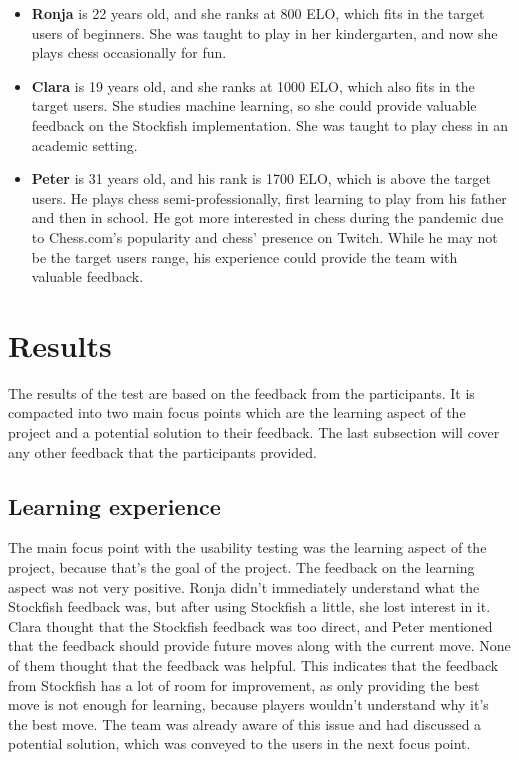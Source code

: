 \begin{itemize}

    \item \textbf{Ronja} is 22 years old, and she ranks at 800 ELO, which fits in the target users of beginners.
    She was taught to play in her kindergarten, and now she plays chess occasionally for fun.

    \item \textbf{Clara} is 19 years old, and she ranks at 1000 ELO, which also fits in the target users.
    She studies machine learning, so she could provide valuable feedback on the Stockfish implementation.
    She was taught to play chess in an academic setting.

    \item \textbf{Peter} is 31 years old, and his rank is 1700 ELO, which is above the target users.
    He plays chess semi-professionally, first learning to play from his father and then in school.
    He got more interested in chess during the pandemic due to Chess.com's popularity and chess' presence on Twitch.
    While he may not be the target users range, his experience could provide the team with valuable feedback.

\end{itemize}

\section{Results}\label{sec:results}

The results of the test are based on the feedback from the participants.
It is compacted into two main focus points which are the learning aspect of the project and a potential solution to
their feedback.
The last subsection will cover any other feedback that the participants provided.

\subsection{Learning experience}\label{subsec:learning-experience}

The main focus point with the usability testing was the learning aspect of the project, because that's the goal of the
project.
The feedback on the learning aspect was not very positive.
Ronja didn't immediately understand what the Stockfish feedback was, but after using Stockfish a little, she lost
interest in it.
Clara thought that the Stockfish feedback was too direct, and Peter mentioned that the feedback should provide future
moves along with the current move.
None of them thought that the feedback was helpful.
This indicates that the feedback from Stockfish has a lot of room for improvement, as only providing the best move is
not enough for learning, because players wouldn't understand why it's the best move.
The team was already aware of this issue and had discussed a potential solution, which was conveyed to the users in the
next focus point.

